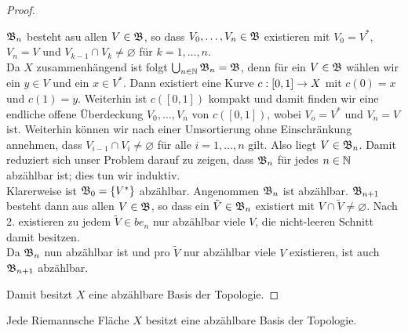 \begin{proof}
\begin{enumerate}
    $\mathfrak{B}_n$ besteht asu allen $V \in \mathfrak{B}$, so dass $V_0, \dots, V_n
    \in \mathfrak{B}$ existieren mit $V_0 = V^\ast$, $V_n = V$ und $V_{k-1}
    \cap V_k \neq \varnothing$ für $k = 1, \dots, n$. \\
    Da $X$ zusammenhängend ist folgt $\bigcup_{n \in \mathbb{N}} \mathfrak{B}_n =
    \mathfrak{B}$, denn für ein $V \in \mathfrak{B}$ wählen wir ein $y \in V$ und ein $x
    \in V^\ast$. Dann existiert eine Kurve $c: [0,1] \rightarrow X$ mit $c(0)
    = x$ und $c(1) = y$. Weiterhin ist $c([0,1])$ kompakt und damit
    finden wir eine endliche offene Überdeckung $V_0, \dots, V_n$ von
    $c([0,1])$, wobei $V_o = V^\ast$ und $V_n = V$ ist. Weiterhin
    können wir nach einer Umsortierung ohne Einschränkung annehmen,
    dass $V_{i-1} \cap V_{i} \neq \varnothing$ für alle $i= 1, \dots,
    n$ gilt. Also liegt $V \in \mathfrak{B}_n$.
    Damit reduziert sich unser Problem darauf zu zeigen, dass $\mathfrak{B}_n$
    für jedes $n \in \mathbb{N}$ abzählbar ist; dies tun wir induktiv. \\
    Klarerweise ist $\mathfrak{B}_0 = \{V^\ast\}$ abzählbar. Angenommen $\mathfrak{B}_n$
    ist abzählbar. $\mathfrak{B}_{n+1}$ besteht dann aus allen $V \in \mathfrak{B}$, so
    dass ein $\tilde V \in \mathfrak{B}_n$ existiert mit $V \cap \tilde V \neq
    \varnothing$. Nach 2. existieren zu jedem $\tilde V \in be_n$ nur
    abzählbar viele $V$, die nicht-leeren Schnitt damit besitzen. \\
    Da $\mathfrak{B}_n$ nun abzählbar ist und pro $\tilde V$ nur abzählbar
    viele $V$ existieren, ist auch $\mathfrak{B}_{n+1}$ abzählbar.
  \end{enumerate}
  Damit besitzt $X$ eine abzählbare Basis der Topologie.
\end{proof}

\begin{thm}[Rad\'o]
  Jede Riemannsche Fläche $X$ besitzt eine abzählbare Basis der
  Topologie.
  \label{thm:rado}
\end{thm}

